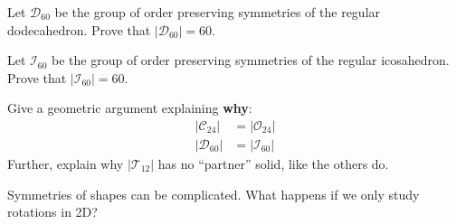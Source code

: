 \documentclass{ximera}
\begin{document}
\begin{exercise}\label{E:symdoe}
  Let $\mathcal{D}_{60}$ be the group of order preserving symmetries
  of the regular dodecahedron. Prove that $|\mathcal{D}_{60}|=60$.
\end{exercise}

\begin{exercise}\label{E:symicos}
  Let $\mathcal{I}_{60}$ be the group of order preserving symmetries
  of the regular icosahedron. Prove that $|\mathcal{I}_{60}|=60$.
\end{exercise}

\begin{exercise}
  Give a geometric argument explaining \textbf{why}:
  \begin{align*}
    |\mathcal{C}_{24}| &= |\mathcal{O}_{24}|\\
    |\mathcal{D}_{60}| &= |\mathcal{I}_{60}|
  \end{align*}
  Further, explain why $|\mathcal{T}_{12}|$ has no ``partner'' solid,
  like the others do.
\end{exercise}









\begin{question}
  Symmetries of shapes can be complicated. What happens if we only
  study rotations in 2D?
\end{question}
\end{document}
